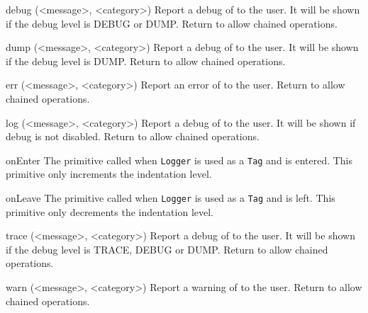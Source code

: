 \begin{urbiscriptapi}

\item[debug](<message>, <category>)%
  Report a debug  of  to the user. It will be
  shown if the debug level is DEBUG or DUMP. Return \this to allow chained
  operations.

\item[dump](<message>, <category>)%
  Report a debug  of  to the user. It will be
  shown if the debug level is DUMP. Return \this to allow chained
  operations.

\item[err](<message>, <category>)%
  Report an error  of  to the user. Return \this
  to allow chained operations.

\item[log](<message>, <category>)%
  Report a debug  of  to the user. It will be
  shown if debug is not disabled. Return \this to allow chained operations.

\item[onEnter]%
  The primitive called when \lstinline|Logger| is used as a \lstinline|Tag|
  and is entered. This primitive only increments the indentation level.

\item[onLeave]%
  The primitive called when \lstinline|Logger| is used as a \lstinline|Tag|
  and is left. This primitive only decrements the indentation level.

\item[trace](<message>, <category>)%
  Report a debug  of  to the user. It will be
  shown if the debug level is TRACE, DEBUG or DUMP. Return \this to allow
  chained operations.

\item[warn](<message>, <category>)%
  Report a warning  of  to the user. Return \this
  to allow chained operations.

\end{urbiscriptapi}

